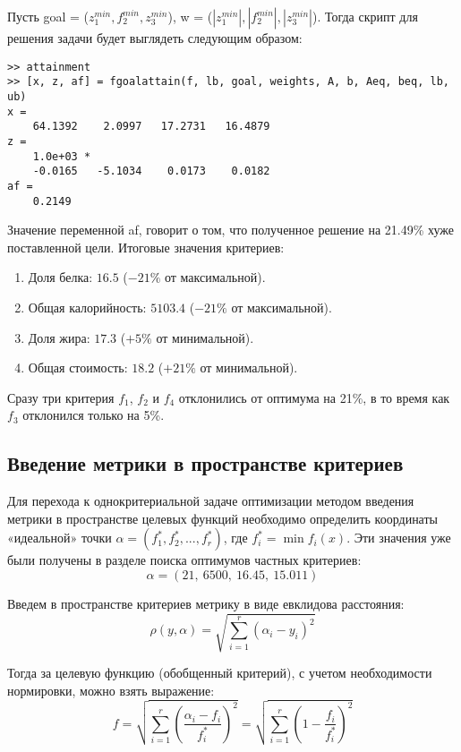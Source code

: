 Пусть goal = ($z_1^{min}, f_2^{min}, z_3^{min}$), w = ($|z_1^{min}|, |f_2^{min}|, |z_3^{min}|$). Тогда скрипт для решения задачи будет выглядеть следующим образом:



\begin{lstlisting}[caption=\code{Console}]
>> attainment
>> [x, z, af] = fgoalattain(f, lb, goal, weights, A, b, Aeq, beq, lb, ub)
x =
	64.1392    2.0997   17.2731   16.4879
z =
	1.0e+03 *
	-0.0165   -5.1034    0.0173    0.0182
af =
	0.2149
\end{lstlisting}

Значение переменной af, говорит о том, что полученное решение на 21.49\% хуже поставленной цели. Итоговые значения критериев:

\begin{enumerate}
	\item Доля белка: $16.5$ ($-21\%$ от максимальной).
	\item Общая калорийность: $5103.4$ ($-21\%$ от максимальной).
	\item Доля жира: $17.3$ ($+5\%$ от минимальной).
	\item Общая стоимость: $18.2$ ($+21\%$ от минимальной).
\end{enumerate}

Сразу три критерия $f_1$, $f_2$ и $f_4$ отклонились от оптимума на 21\%, в то время как $f_3$ отклонился только на 5\%.

\subsection{Введение метрики в пространстве критериев}

Для перехода к однокритериальной задаче оптимизации методом введения метрики в пространстве целевых функций необходимо определить координаты «идеальной» точки 
$\alpha = (f_1^*, f_2^*, ..., f_r^*)$,  где $f_i^* = \min f_i(x)$. Эти значения
уже были получены в разделе поиска оптимумов частных критериев:
$$
\alpha = (21,\ 6500,\ 16.45,\ 15.011)
$$

Введем в пространстве критериев метрику в виде евклидова расстояния:
$$
\rho(y, \alpha) = \sqrt{\sum_{i=1}^r(\alpha_i - y_i)^2}
$$

Тогда за целевую функцию (обобщенный критерий), с учетом необходимости нормировки, можно взять выражение:
$$
f = \sqrt{ \sum_{i=1}^r \left( \frac{\alpha_i-f_i}{f_i^*} \right)^2 } 
= \sqrt{ \sum_{i=1}^r \left( 1 - \frac{f_i}{f_i^*} \right)^2 }
$$

